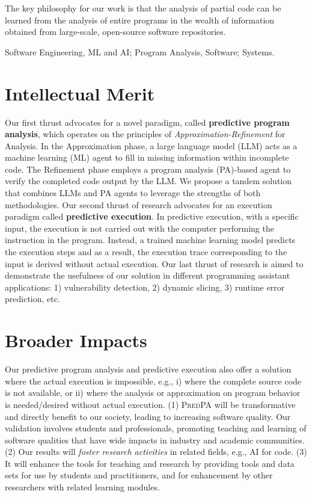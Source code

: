 \documentclass[11pt]{article}
\newcommand{\tool}{\textsc{PredPA}\xspace}
\begin{document}
The key philosophy for our work is that the analysis of
partial code can be learned from the analysis of entire programs in
the wealth of information obtained from large-scale, open-source
software repositories.


 Software Engineering, ML and AI; Program Analysis, Software; Systems.

\section{Intellectual Merit}

Our first thrust advocates for a novel paradigm, called {\bf
  predictive program analysis}, which operates on the principles of
{\em Approximation-Refinement} for Analysis. In the Approximation
phase, a large language model (LLM) acts as a machine learning (ML)
agent to fill in missing information within incomplete code. The
Refinement phase employs a program analysis (PA)-based agent to verify
the completed code output by the LLM. We propose a tandem solution
that combines LLMs and PA agents to leverage the strengths of both
methodologies. Our second thrust of research advocates for an
execution paradigm called {\bf predictive execution}. In predictive
execution, with a specific input, the execution is not carried out
with the computer performing the instruction in the program. Instead,
a trained machine learning model predicts the execution steps and as a
result, the execution trace corresponding to the input is derived
without actual execution. Our last thrust of research is aimed to
demonstrate the usefulness of our solution in different programming
assistant applications: 1) vulnerability detection, 2) dynamic
slicing, 3) runtime error prediction, etc.

\section{Broader Impacts}


Our predictive program analysis and predictive execution also offer a
solution where the actual execution is impossible, e.g., i) where the complete source code is
not available, or ii) where the analysis or approximation on
program behavior is needed/desired without actual execution. (1)
{\tool} will be transformative and directly benefit to our
  society, leading to increasing software quality.  Our validation
involves students and professionals, promoting teaching and learning
of software qualities that have wide impacts in industry and academic
communities. (2) Our results will {\em foster research activities} in
related fields, e.g., AI for code. (3) It will
enhance the tools for teaching and research by providing tools and
data sets for use by students and practitioners, and for enhancement
by other researchers with related learning modules.
\end{document}
